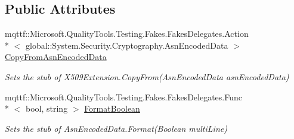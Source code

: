 \subsection*{Public Attributes}
\begin{DoxyCompactItemize}
\item 
mqttf\-::\-Microsoft.\-Quality\-Tools.\-Testing.\-Fakes.\-Fakes\-Delegates.\-Action\\*
$<$ global\-::\-System.\-Security.\-Cryptography.\-Asn\-Encoded\-Data $>$ \hyperlink{class_system_1_1_security_1_1_cryptography_1_1_x509_certificates_1_1_fakes_1_1_stub_x509_extension_ad9969a3ff9ecca4a1410d5a75dc2c607}{Copy\-From\-Asn\-Encoded\-Data}
\begin{DoxyCompactList}\small\item\em Sets the stub of X509\-Extension.\-Copy\-From(\-Asn\-Encoded\-Data asn\-Encoded\-Data)\end{DoxyCompactList}\item 
mqttf\-::\-Microsoft.\-Quality\-Tools.\-Testing.\-Fakes.\-Fakes\-Delegates.\-Func\\*
$<$ bool, string $>$ \hyperlink{class_system_1_1_security_1_1_cryptography_1_1_x509_certificates_1_1_fakes_1_1_stub_x509_extension_aa74b601af3993add72580520dc4fa92e}{Format\-Boolean}
\begin{DoxyCompactList}\small\item\em Sets the stub of Asn\-Encoded\-Data.\-Format(\-Boolean multi\-Line)\end{DoxyCompactList}\end{DoxyCompactItemize}
